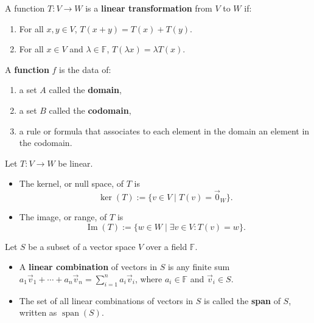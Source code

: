 \documentclass{article}
\begin{document}
\begin{definition}
    A function \( T: V \to W \) is a \textbf{linear transformation} from \( V \) to \( W \) if:
    \begin{enumerate}
        \item For all \( x, y \in V \), \( T(x + y) = T(x) + T(y) \).
        \item For all \( x \in V \) and \( \lambda \in \mathbb{F} \), \( T(\lambda x) = \lambda T(x) \).
    \end{enumerate}
\end{definition}

\begin{definition}[Function]
    A \textbf{function} \( f \) is the data of:
    \begin{enumerate}
        \item a set \( A \) called the \textbf{domain},
        \item a set \( B \) called the \textbf{codomain},
        \item a rule or formula that associates to each element in the domain an element in the codomain.
    \end{enumerate}
\end{definition}

\begin{definition}
    Let \( T: V \to W \) be linear.
    \begin{itemize}
        \item The kernel, or null space, of \( T \) is 
        \[
        \ker(T) := \{ v \in V \mid T(v) = \vec{0}_W \}.
        \]
        \item The image, or range, of \( T \) is 
        \[
        \operatorname{Im}(T) := \{ w \in W \mid \exists v \in V: T(v) = w \}.
        \]
    \end{itemize}
\end{definition}

\begin{definition}
    Let \( S \) be a subset of a vector space \( V \) over a field \( \mathbb{F} \).
    \begin{itemize}
        \item A \textbf{linear combination} of vectors in \( S \) is any finite sum \( a_1\vec{v}_1 + \cdots + a_n\vec{v}_n = \sum_{i=1}^{n} a_i \vec{v}_i \), where \( a_i \in \mathbb{F} \) and \( \vec{v}_i \in S \).
        \item The set of all linear combinations of vectors in \( S \) is called the \textbf{span} of \( S \), written as \(\operatorname{span}(S)\).
    \end{itemize}
\end{definition}
\end{document}
